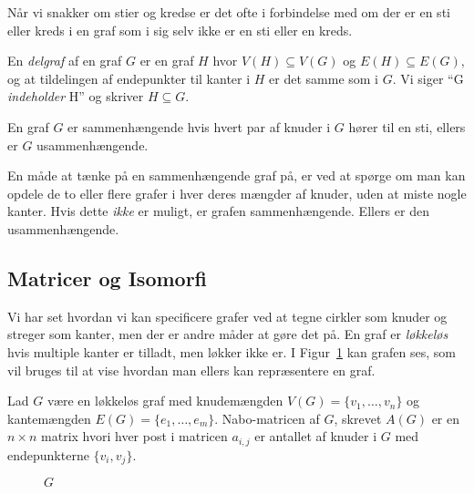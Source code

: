 Når vi snakker om stier og kredse er det ofte i forbindelse med om der er en sti eller kreds i en graf som i sig selv ikke er en sti eller en kreds.

\begin{definition}[Delgraf]
	En \textit{delgraf} af en graf $G$ er en graf $H$ hvor $V(H) \subseteq V(G)$ og $E(H) \subseteq E(G)$, og at tildelingen af endepunkter til kanter i $H$ er det samme som i $G$. Vi siger ``G \textit{indeholder} H'' og skriver $H \subseteq G$.
\end{definition}

\begin{definition}
	En graf $G$ er sammenhængende hvis hvert par af knuder i $G$ hører til en sti, ellers er $G$ usammenhængende.
\end{definition}

En måde at tænke på en sammenhængende graf på, er ved at spørge om man kan opdele de to eller flere grafer i hver deres mængder af knuder, uden at miste nogle kanter. Hvis dette \textit{ikke} er muligt, er grafen sammenhængende. Ellers er den usammenhængende.


\subsection{Matricer og Isomorfi}%
\label{subsec:label}

Vi har set hvordan vi kan specificere grafer ved at tegne cirkler som knuder og streger som kanter, men der er andre måder at gøre det på. En graf er \textit{løkkeløs} hvis multiple kanter er tilladt, men løkker ikke er. I Figur~\ref{fig:pp7g} kan grafen ses, som vil bruges til at vise hvordan man ellers kan repræsentere en graf.


\begin{definition}
    Lad $G$ være en løkkeløs graf med knudemængden $V(G) = \{v_{1}, \ldots, v_{n}\}$ og kantemængden $E(G) = \{e_{1}, \ldots, e_{m}\}$. Nabo-matricen af $G$, skrevet $A(G)$ er en $n \times n$ matrix hvori hver post i matricen $a_{i,j}$ er antallet af knuder i $G$ med endepunkterne $\{v_{i}, v_{j}\}$.
\end{definition}

\begin{figure}[H]
    \vspace{-20pt} %
    \centering
    \caption{\label{fig:pp7g} $G$}
\end{figure}


